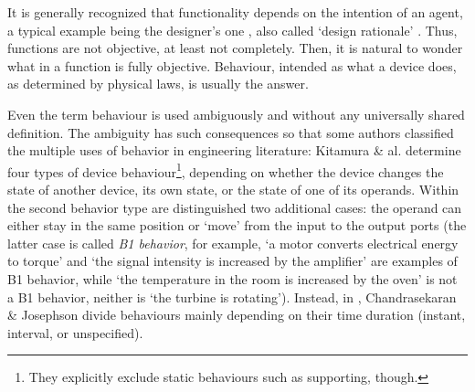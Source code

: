 \documentclass[sw]{iosart2x}
\newcommand{\firstTimeKeyWord}[1]{\textit{#1}}
\newcommand{\quotes}[1]{`#1'}
\newcommand{\TODO}[1]{{\color{red} #1}}
\begin{document}
It is generally recognized that functionality depends on the intention of an agent, a typical example being the designer's one \cite{kitamuraOntologyBasedFunctionalKnowledgeModeling2004}, also called \quotes{design rationale} \cite{chandrasekaranFunctionalRepresentationDesign1993}. 
Thus, functions are not objective, at least not completely. 
Then, it is natural to wonder what in a function is fully objective. Behaviour, intended as what a device does, as determined by physical laws, is usually the answer.    


Even the term behaviour is used ambiguously and without any universally shared definition. 
The ambiguity has such consequences so that some authors classified the multiple uses of behavior in engineering literature: 
Kitamura \& al. \cite{kitamuraOntologyBasedFunctionalKnowledgeModeling2004} determine four types of device behaviour\footnote{They explicitly exclude static behaviours such as supporting, though.}, depending on whether the device changes the state of another device, its own state, or the state of one of its operands. Within the second behavior type are distinguished two additional cases: the operand can either stay in the same position or `move' from the input to the output ports (the latter case is called \firstTimeKeyWord{B1 behavior}, for example, \quotes{a motor converts electrical energy to torque} and \quotes{the signal intensity is increased by the amplifier} are examples of B1 behavior, while \quotes{the temperature in the room is increased by the oven} is not a B1 behavior, neither is \quotes{the turbine is rotating}).
Instead, in \cite{chandrasekaranFunctionDeviceRepresentation2000}, Chandrasekaran \& Josephson divide behaviours mainly depending on their time duration (instant, interval, or unspecified).

\end{document}
